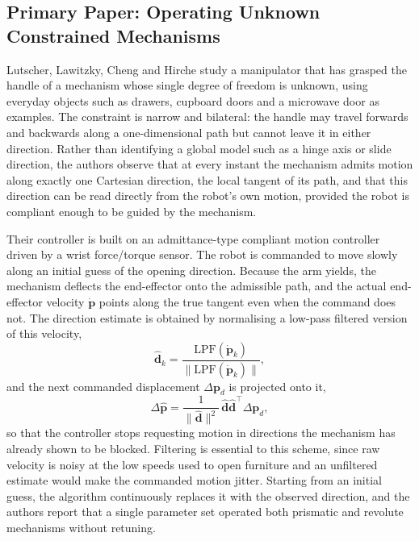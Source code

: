\documentclass[11pt,letterpaper]{article}
\newcommand{\vect}[1]{\bm{#1}}
\begin{document}
\subsection{Primary Paper: Operating Unknown Constrained Mechanisms}
\label{sec:primary}

Lutscher, Lawitzky, Cheng and Hirche \cite{lutscher2010control} study a manipulator that has grasped the handle of a mechanism whose single degree of freedom is unknown, using everyday objects such as drawers, cupboard doors and a microwave door as examples. The constraint is narrow and bilateral: the handle may travel forwards and backwards along a one-dimensional path but cannot leave it in either direction. Rather than identifying a global model such as a hinge axis or slide direction, the authors observe that at every instant the mechanism admits motion along exactly one Cartesian direction, the local tangent of its path, and that this direction can be read directly from the robot's own motion, provided the robot is compliant enough to be guided by the mechanism.

Their controller is built on an admittance-type compliant motion controller driven by a wrist force/torque sensor. The robot is commanded to move slowly along an initial guess of the opening direction. Because the arm yields, the mechanism deflects the end-effector onto the admissible path, and the actual end-effector velocity $\dot{\vect{p}}$ points along the true tangent even when the command does not. The direction estimate is obtained by normalising a low-pass filtered version of this velocity,
\begin{equation}
  \hat{\vect{d}}_k = \frac{\mathrm{LPF}(\dot{\vect{p}}_k)}{\bigl\lVert \mathrm{LPF}(\dot{\vect{p}}_k)\bigr\rVert},
  \label{eq:lutscher-est}
\end{equation}
and the next commanded displacement $\Delta\vect{p}_d$ is projected onto it,
\begin{equation}
  \Delta\hat{\vect{p}} = \frac{1}{\lVert\hat{\vect{d}}\rVert^{2}}\,\hat{\vect{d}}\hat{\vect{d}}^{\top}\Delta\vect{p}_d ,
  \label{eq:lutscher-proj}
\end{equation}
so that the controller stops requesting motion in directions the mechanism has already shown to be blocked. Filtering is essential to this scheme, since raw velocity is noisy at the low speeds used to open furniture and an unfiltered estimate would make the commanded motion jitter. Starting from an initial guess, the algorithm continuously replaces it with the observed direction, and the authors report that a single parameter set operated both prismatic and revolute mechanisms without retuning.
\end{document}

